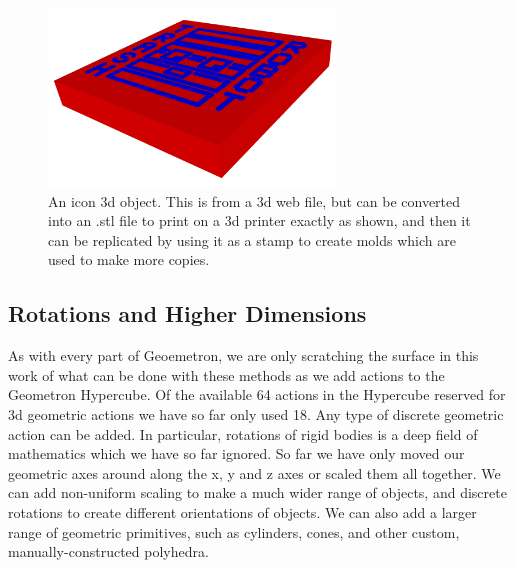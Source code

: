 \begin{figure}
	\centering
	\includegraphics[width=3in]{figures/geometron3d/trashrobot3d.png}
	\caption[trashrobot3d]
	{An icon 3d object.  This is from a 3d web file, but can be converted into an .stl file to print on a 3d printer exactly as shown, and then it can be replicated by using it as a stamp to create molds which are used to make more copies.}
\end{figure}

\subsection{Rotations and Higher Dimensions}

As with every part of Geoemetron, we are only scratching the surface in this work of what can be done with these methods as we add actions to the Geometron Hypercube.  Of the available 64 actions in the Hypercube reserved for 3d geometric actions we have so far only used 18. Any type of discrete geometric action can be added.  In particular, rotations of rigid bodies is a deep field of mathematics which we have so far ignored.  So far we have only moved our geometric axes around along the x, y and z axes or scaled them all together.  We can add non-uniform scaling to make a much wider range of objects, and discrete rotations to create different orientations of objects.  We can also add a larger range of geometric primitives, such as cylinders, cones, and other custom, manually-constructed polyhedra.  


